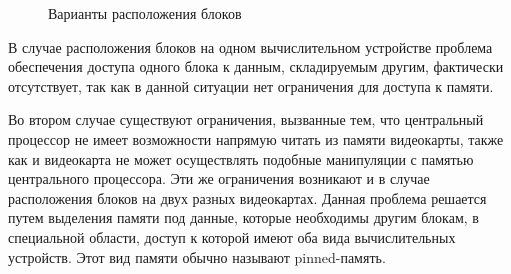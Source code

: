 \documentclass[a4paper, 14pt]{extarticle}
\theoremstyle{definition}
\begin{document}
\begin{figure}[h]
\begin{minipage}[h]{0.6\linewidth}
	\end{minipage}
	\hfill
	\begin{minipage}[h]{1.0\linewidth}
	\end{minipage}
	\caption{Варианты расположения блоков}
	\label{ris:var}
\end{figure}

\par В случае расположения блоков на одном вычислительном устройстве проблема обеспечения доступа одного блока к данным, складируемым другим, фактически отсутствует, так как в данной ситуации нет ограничения для доступа к памяти.

\par Во втором случае существуют ограничения, вызванные тем, что центральный процессор не имеет возможности напрямую читать из памяти видеокарты, также как и видеокарта не может осуществлять подобные манипуляции с памятью центрального процессора. Эти же ограничения возникают и в случае расположения блоков на двух разных видеокартах. Данная проблема решается путем выделения памяти под данные, которые необходимы другим блокам, в специальной области, доступ к которой имеют оба вида вычислительных устройств. Этот вид памяти обычно называют pinned-память.
\end{document}
